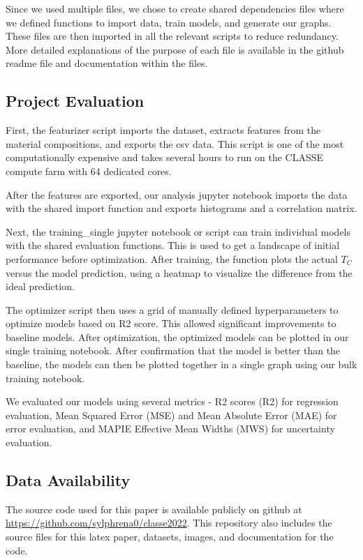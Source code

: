 \documentclass[twocolumn, nofootinbib, secnumarabic, amssymb, nobibnotes, aps, prd]{revtex4-2}
\begin{document}
Since we used multiple files, we chose to create shared dependencies files where we defined functions to import data, train models, and generate our graphs. These files are then imported in all the relevant scripts to reduce redundancy. More detailed explanations of the purpose of each file is available in the github readme file and documentation within the files.

\subsection{Project Evaluation}

First, the featurizer script imports the dataset, extracts features from the material compositions, and exports the csv data. This script is one of the most computationally expensive and takes several hours to run on the CLASSE compute farm with 64 dedicated cores.

After the features are exported, our analysis jupyter notebook imports the data with the shared import function and exports histograms and a correlation matrix. 

Next, the training\_single jupyter notebook or script can train individual models with the shared evaluation functions. This is used to get a landscape of initial performance before optimization. After training, the function plots the actual $T_C$ versus the model prediction, using a heatmap to visualize the difference from the ideal prediction.

The optimizer script then uses a grid of manually defined hyperparameters to optimize models based on R2 score. This allowed significant improvements to baseline models. After optimization, the optimized models can be plotted in our single training notebook. After confirmation that the model is better than the baseline, the models can then be plotted together in a single graph using our bulk training notebook. 

We evaluated our models using several metrics - R2 scores (R2) for regression evaluation, Mean Squared Error (MSE) and Mean Absolute Error (MAE) for error evaluation, and MAPIE Effective Mean Widths (MWS) for uncertainty evaluation.

\subsection{Data Availability}
The source code used for this paper is available publicly on github at \url{https://github.com/sylphrena0/classe2022}. This repository also includes the source files for this latex paper, datasets, images, and documentation for the code.
\end{document}

